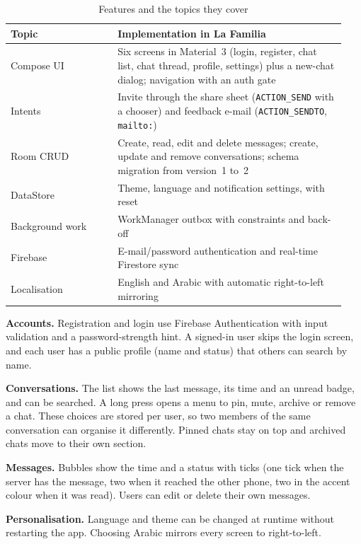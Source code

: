 \documentclass[sigconf,nonacm]{acmart}
\begin{document}
\begin{table}[h]
  \caption{Features and the topics they cover}
  \label{tab:features}
  \small
  \begin{tabular}{@{}p{0.30\linewidth}p{0.64\linewidth}@{}}
    \toprule
    Topic & Implementation in La Familia \\
    \midrule
    Compose UI & Six screens in Material~3 (login, register, chat list, chat thread,
                 profile, settings) plus a new-chat dialog; navigation with an auth gate \\
    Intents & Invite through the share sheet (\texttt{ACTION\_SEND} with a chooser) and
              feedback e-mail (\texttt{ACTION\_SENDTO}, \texttt{mailto:}) \\
    Room CRUD & Create, read, edit and delete messages; create, update and remove
                conversations; schema migration from version~1 to~2 \\
    DataStore & Theme, language and notification settings, with reset \\
    Background work & WorkManager outbox with constraints and back-off \\
    Firebase & E-mail/password authentication and real-time Firestore sync \\
    Localisation & English and Arabic with automatic right-to-left mirroring \\
    \bottomrule
  \end{tabular}
\end{table}

\textbf{Accounts.} Registration and login use Firebase Authentication with input
validation and a password-strength hint. A signed-in user skips the login screen, and
each user has a public profile (name and status) that others can search by name.

\textbf{Conversations.} The list shows the last message, its time and an unread badge,
and can be searched. A long press opens a menu to pin, mute, archive or remove a chat.
These choices are stored per user, so two members of the same conversation can organise
it differently. Pinned chats stay on top and archived chats move to their own section.

\textbf{Messages.} Bubbles show the time and a status with ticks (one tick when the
server has the message, two when it reached the other phone, two in the accent colour
when it was read). Users can edit or delete their own messages.

\textbf{Personalisation.} Language and theme can be changed at runtime without
restarting the app. Choosing Arabic mirrors every screen to right-to-left.
\end{document}
